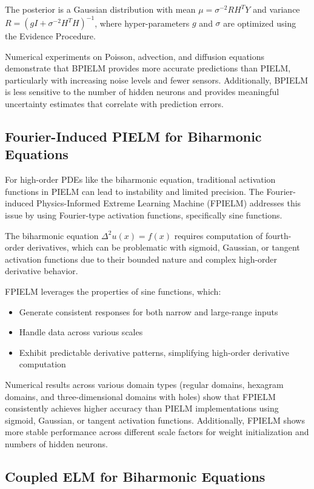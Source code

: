\documentclass[11pt]{article}
\begin{document}
The posterior is a Gaussian distribution with mean $\mu = \sigma^{-2}RH^TY$ and variance $R = (gI + \sigma^{-2}H^TH)^{-1}$, where hyper-parameters $g$ and $\sigma$ are optimized using the Evidence Procedure.

Numerical experiments on Poisson, advection, and diffusion equations demonstrate that BPIELM provides more accurate predictions than PIELM, particularly with increasing noise levels and fewer sensors. Additionally, BPIELM is less sensitive to the number of hidden neurons and provides meaningful uncertainty estimates that correlate with prediction errors.

\subsection{Fourier-Induced PIELM for Biharmonic Equations}

For high-order PDEs like the biharmonic equation, traditional activation functions in PIELM can lead to instability and limited precision. The Fourier-induced Physics-Informed Extreme Learning Machine (FPIELM) \citep{Li2023} addresses this issue by using Fourier-type activation functions, specifically sine functions.

The biharmonic equation $\Delta^2 u(x) = f(x)$ requires computation of fourth-order derivatives, which can be problematic with sigmoid, Gaussian, or tangent activation functions due to their bounded nature and complex high-order derivative behavior.

FPIELM leverages the properties of sine functions, which:
\begin{itemize}
    \item Generate consistent responses for both narrow and large-range inputs
    \item Handle data across various scales
    \item Exhibit predictable derivative patterns, simplifying high-order derivative computation
\end{itemize}

Numerical results across various domain types (regular domains, hexagram domains, and three-dimensional domains with holes) show that FPIELM consistently achieves higher accuracy than PIELM implementations using sigmoid, Gaussian, or tangent activation functions. Additionally, FPIELM shows more stable performance across different scale factors for weight initialization and numbers of hidden neurons.

\subsection{Coupled ELM for Biharmonic Equations}
\end{document}
